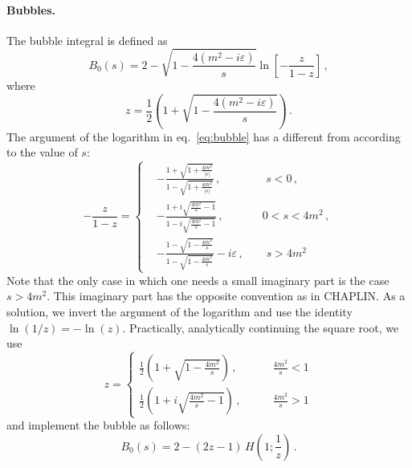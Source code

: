 \documentclass[12pt,a4wide]{article}
\begin{document}
\paragraph{Bubbles.} The bubble integral is defined as
\begin{equation}
  \label{eq:bubble}
  B_0(s)=2 -\sqrt{1-\frac{4(m^2-i\varepsilon)}{s}}\ln\left[-\frac{z}{1-z}\right]\,,
\end{equation}
where 
\begin{equation}
  \label{eq:z}
  z=\frac{1}{2}\left(1+\sqrt{1-\frac{4(m^2-i\varepsilon)}{s}}\right)\,.
\end{equation}
The argument of the logarithm in eq.~\eqref{eq:bubble} has a different
from according to the value of $s$:
\begin{equation}
  \label{eq:z-omz}
  -\frac{z}{1-z} = \left\{
    \begin{split}
      &-\frac{1+\sqrt{1+\frac{4m^2}{|s|}}}{1-\sqrt{1+\frac{4m^2}{|s|}}}\,,\qquad \qquad s<0\,,\\
        & -\frac{1+i\sqrt{\frac{4m^2}{s}-1}}{1-i\sqrt{\frac{4m^2}{s}-1}}\,,\qquad \quad\>\> 0<s<4m^2\,,\\
        &
        -\frac{1-\sqrt{1-\frac{4m^2}{s}}}{1-\sqrt{1-\frac{4m^2}{s}}}-i\varepsilon\,,\qquad
        s>4m^2
    \end{split}
\right.
\end{equation}
Note that the only case in which one needs a small imaginary part is
the case $s>4m^2$. This imaginary part has the opposite convention as
in CHAPLIN. As a solution, we invert the argument of the logarithm and
use the identity $\ln(1/z)=-\ln(z)$. Practically, analytically
continuing the square root, we use
\begin{equation}
  \label{eq:z-implemented}
  z = \left\{\begin{split}
      \frac{1}{2}\left(1+\sqrt{1-\frac{4m^2}{s}}\right)\,,& \qquad \frac{4m^2}{s}<1\\
      \frac{1}{2}\left(1+i\sqrt{\frac{4m^2}{s}-1}\right)\,,& \qquad \frac{4m^2}{s}>1
    \end{split}
    \right.
  \end{equation}
and implement the bubble as follows:
\begin{equation}
  \label{eq:bubble-implemented}
  B_0(s)=
      2 -(2 z-1) \,H\left(1;\frac{1}{z}\right) \,.
\end{equation}

 
\end{document}
